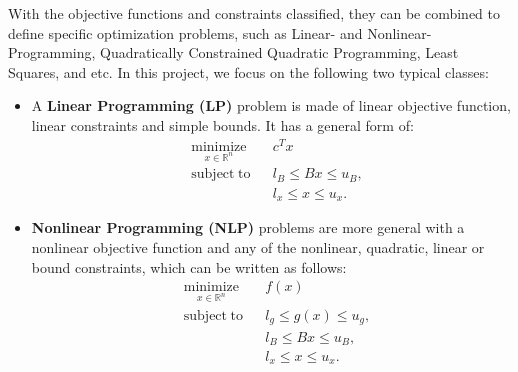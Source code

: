 \documentclass{book}
\begin{document}
With the objective functions and constraints classified, they can be combined to define specific optimization problems, such as Linear- and Nonlinear- Programming, Quadratically Constrained Quadratic Programming, Least Squares, and etc. In this project, we focus on the following two typical classes: 
\begin{itemize}
\item A \textbf{Linear Programming (LP)} problem is made of linear objective function, linear constraints and simple bounds. It has a general form of: 
$${\displaystyle {\begin{aligned}
&{\underset{x\in \mathbb{R}^n}{\operatorname{minimize}} }&&c^Tx\\&{\operatorname{subject\; to}}&& l_B \leq Bx \leq u_B,\\&&&l_x \leq x \leq u_x.\end{aligned}}}$$ 
\item \textbf{Nonlinear Programming (NLP)} problems are more general with a nonlinear objective function and any of the nonlinear, quadratic, linear or bound constraints, which can be written as follows:
$${\displaystyle {\begin{aligned}
&{\underset{x\in \mathbb{R}^n}{\operatorname{minimize}} }&&f(x)\\ &{\operatorname{subject\; to}}&& l_g \leq g(x) \leq u_g,\\&&&l_B \leq Bx \leq u_B,\\&&&l_x \leq x \leq u_x.\end{aligned}}}$$ 
\end{itemize}
\end{document}
